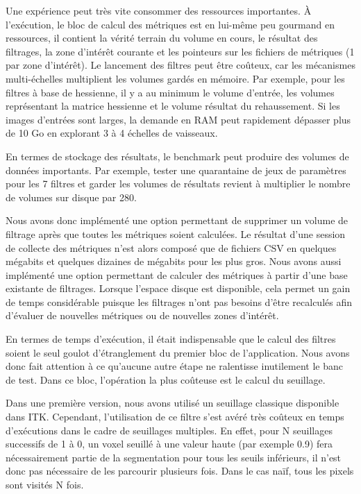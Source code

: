 Une expérience peut très vite consommer des ressources importantes. À l'exécution, le bloc de calcul des métriques est en lui-même peu gourmand en ressources, il contient la vérité terrain du volume en cours, le résultat des filtrages, la zone d'intérêt courante et les pointeurs sur les fichiers de métriques (1 par zone d'intérêt). Le lancement des filtres peut être coûteux, car les mécanismes multi-échelles multiplient les volumes gardés en mémoire. Par exemple, pour les filtres à base de hessienne, il y a au minimum le volume d'entrée, les volumes représentant la matrice hessienne et le volume résultat du rehaussement. Si les images d'entrées sont larges, la demande en RAM peut rapidement dépasser plus de 10 Go en explorant 3 à 4 échelles de vaisseaux. 

En termes de stockage des résultats, le benchmark peut produire des volumes de données importants. Par exemple, tester une quarantaine de jeux de paramètres pour les 7 filtres et garder les volumes de résultats revient à multiplier le nombre de volumes sur disque par 280. 

Nous avons donc implémenté une option permettant de supprimer un volume de filtrage après que toutes les métriques soient calculées. Le résultat d'une session de collecte des métriques n'est alors composé que de fichiers CSV en quelques mégabits et quelques dizaines de mégabits pour les plus gros. Nous avons aussi implémenté une option permettant de calculer des métriques à partir d'une base existante de filtrages. Lorsque l'espace disque est disponible, cela permet un gain de temps considérable puisque les filtrages n'ont pas besoins d'être recalculés afin d'évaluer de nouvelles métriques ou de nouvelles zones d'intérêt.

En termes de temps d'exécution, il était indispensable que le calcul des filtres soient le seul goulot d'étranglement du premier bloc de l'application. Nous avons donc fait attention à ce qu'aucune autre étape ne ralentisse inutilement le banc de test. Dans ce bloc, l'opération la plus coûteuse est le calcul du seuillage.

Dans une première version, nous avons utilisé un seuillage classique disponible dans ITK. Cependant, l'utilisation de ce filtre s'est avéré très coûteux en temps d'exécutions dans le cadre de seuillages multiples. En effet, pour N seuillages successifs de 1 à 0, un voxel seuillé à une valeur haute (par exemple 0.9) fera nécessairement partie de la segmentation pour tous les seuils inférieurs, il n'est donc pas nécessaire de les parcourir plusieurs fois. Dans le cas naïf, tous les pixels sont visités N fois.

